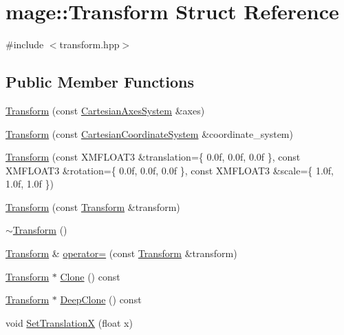 \hypertarget{structmage_1_1_transform}{}\section{mage\+:\+:Transform Struct Reference}
\label{structmage_1_1_transform}


{\ttfamily \#include $<$transform.\+hpp$>$}

\subsection*{Public Member Functions}
\begin{DoxyCompactItemize}
\item 
\hyperlink{structmage_1_1_transform_a1a4624639a7da3608738f52b8cfc6bf3}{Transform} (const \hyperlink{structmage_1_1_cartesian_axes_system}{Cartesian\+Axes\+System} \&axes)
\item 
\hyperlink{structmage_1_1_transform_a15966913f9d2f02f29da116637fc3bff}{Transform} (const \hyperlink{structmage_1_1_cartesian_coordinate_system}{Cartesian\+Coordinate\+System} \&coordinate\+\_\+system)
\item 
\hyperlink{structmage_1_1_transform_a3d324dc935e11ee5e82957d58553fd7d}{Transform} (const X\+M\+F\+L\+O\+A\+T3 \&translation=\{ 0.\+0f, 0.\+0f, 0.\+0f \}, const X\+M\+F\+L\+O\+A\+T3 \&rotation=\{ 0.\+0f, 0.\+0f, 0.\+0f \}, const X\+M\+F\+L\+O\+A\+T3 \&scale=\{ 1.\+0f, 1.\+0f, 1.\+0f \})
\item 
\hyperlink{structmage_1_1_transform_a6cf7a754eff6ffe6f99f8942468d49bc}{Transform} (const \hyperlink{structmage_1_1_transform}{Transform} \&transform)
\item 
\hyperlink{structmage_1_1_transform_a3380713ee853d112c140e8688c0f73b5}{$\sim$\+Transform} ()
\item 
\hyperlink{structmage_1_1_transform}{Transform} \& \hyperlink{structmage_1_1_transform_aec91179a63ea0c9af1023a38b60f197c}{operator=} (const \hyperlink{structmage_1_1_transform}{Transform} \&transform)
\item 
\hyperlink{structmage_1_1_transform}{Transform} $\ast$ \hyperlink{structmage_1_1_transform_afdae6837c2c49e598a6aca1ceab5e561}{Clone} () const
\item 
\hyperlink{structmage_1_1_transform}{Transform} $\ast$ \hyperlink{structmage_1_1_transform_a20190fe94be3467fee3032a2d912247d}{Deep\+Clone} () const
\item 
void \hyperlink{structmage_1_1_transform_a003d84bc07835f17e8598dceda06d973}{Set\+TranslationX} (float x)

\end{DoxyCompactItemize}
